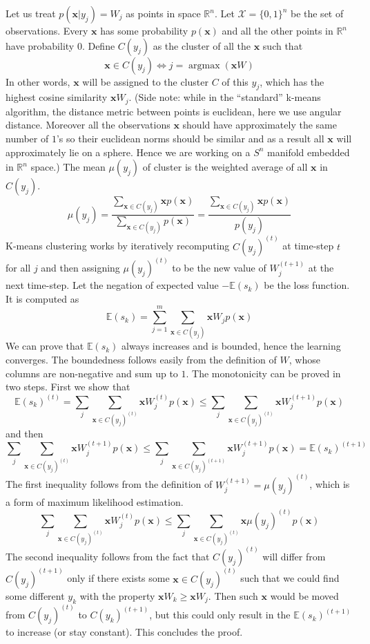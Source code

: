 \documentclass[12pt]{article}
\DeclareMathOperator*{\argmax}{argmax}
\begin{document}
Let us treat $p(\boldsymbol{x}|y_j)=W_j$ as points in space $\mathbb{R}^n$. Let $\mathcal{X} =\{0,1\}^n$  be the set of observations. Every $\boldsymbol{x}$ has some probability $p(\boldsymbol{x})$ and all the other points in $\mathbb{R}^n$ have probability $0$. Define $C(y_j)$ as the cluster of all the $\boldsymbol{x}$ such that
\[
\boldsymbol{x} \in C(y_j) \iff  j = \argmax(\boldsymbol{x} W)
\]
In other words, $\boldsymbol{x}$ will be assigned to the cluster $C$ of this  $y_j$, which has the highest cosine similarity $\boldsymbol{x}W_j$. (Side note: while in the ``standard'' k-means algorithm, the distance metric between points is euclidean, here we use angular distance. Moreover all the observations $\boldsymbol{x}$ should have approximately the same number of $1$'s so their euclidean norms should be similar and as a result all $\boldsymbol{x}$ will approximately lie on a sphere.  Hence we are working on a $S^n$ manifold embedded in $\mathbb{R}^n$ space.)  The mean $\mu(y_j)$ of cluster is the weighted average of all $\boldsymbol{x}$ in $C(y_j)$.
\[
\mu(y_j) = \frac{\sum_{\boldsymbol{x} \in C(y_j)} \boldsymbol{x}p(\boldsymbol{x})}{\sum_{\boldsymbol{x} \in C(y_j)}p(\boldsymbol{x})} = \frac{\sum_{\boldsymbol{x} \in C(y_j)} \boldsymbol{x}p(\boldsymbol{x})}{p(y_j)}
\]
K-means clustering works by iteratively recomputing $C(y_j)^{(t)}$ at time-step $t$ for all $j$ and then assigning $\mu(y_j)^{(t)}$ to be the new value of $W_j^{(t+1)}$ at the next time-step.  Let the negation of expected value $-\mathbb{E}(s_k)$ be the loss function. It is computed as
\[
\mathbb{E}(s_k) = \sum_{j=1}^{m} \sum_{\boldsymbol{x}\in C(y_j)} \boldsymbol{x}W_j p(\boldsymbol{x})
\]
We can prove that $\mathbb{E}(s_k)$ always increases and is bounded, hence the learning converges. The boundedness follows easily from the definition of $W$, whose columns are non-negative and sum up to $1$.   The monotonicity can be proved in two steps. First we show that
\[
\mathbb{E}(s_k)^{(t)} = \sum_{j} \sum_{\boldsymbol{x}\in C(y_j)^{(t)}} \boldsymbol{x}W_j^{(t)}p(\boldsymbol{x}) \le \sum_{j} \sum_{\boldsymbol{x}\in C(y_j)^{(t)}} \boldsymbol{x}W_j^{(t+1)}p(\boldsymbol{x})
\]
and then
\[
\sum_{j} \sum_{\boldsymbol{x}\in C(y_j)^{(t)}} \boldsymbol{x}W_j^{(t+1)}p(\boldsymbol{x}) \le \sum_{j} \sum_{\boldsymbol{x}\in C(y_j)^{(t+1)}} \boldsymbol{x}W_j^{(t+1)}p(\boldsymbol{x}) = \mathbb{E}(s_k)^{(t+1)}
\]
The first inequality follows from the definition of $W_j^{(t+1)} = \mu(y_j)^{(t)}$, which is a form of maximum likelihood estimation.
\[
\sum_{j} \sum_{\boldsymbol{x}\in C(y_j)^{(t)}} \boldsymbol{x}W_j^{(t)}p(\boldsymbol{x}) \le \sum_{j} \sum_{\boldsymbol{x}\in C(y_j)^{(t)}} \boldsymbol{x}\mu(y_j)^{(t)} p(\boldsymbol{x})
\]
The second inequality follows from the fact that $C(y_j)^{(t)}$ will differ from $C(y_j)^{(t+1)}$ only if there exists some $\boldsymbol{x} \in C(y_j)^{(t)}$ such that we could find some different $y_k$ with the property $\boldsymbol{x} W_k \ge \boldsymbol{x} W_j$. Then such $\boldsymbol{x}$ would be moved from $C(y_j)^{(t)}$ to $C(y_k)^{(t+1)}$, but this could only result in the $\mathbb{E}(s_k)^{(t+1)}$ to increase (or stay constant). This concludes the proof.
\end{document}
